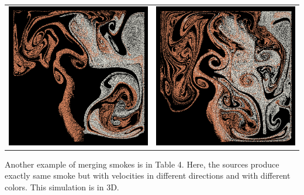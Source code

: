 \documentclass[a4paper,11pt]{article}
\theoremstyle{mytheor}
\begin{document}
\begin{table}[H]
\begin{tabular}{cc}
\includegraphics[width=70mm]{interacting2_4.png}&\includegraphics[width=70mm]{interacting2_5.png}\\
\end{tabular}
\end{table}


\par
\noindent
Another example of merging smokes is in Table 4. Here, the sources produce exactly same smoke but with velocities in different directions and with different colors. This simulation is in 3D.
\end{document}
